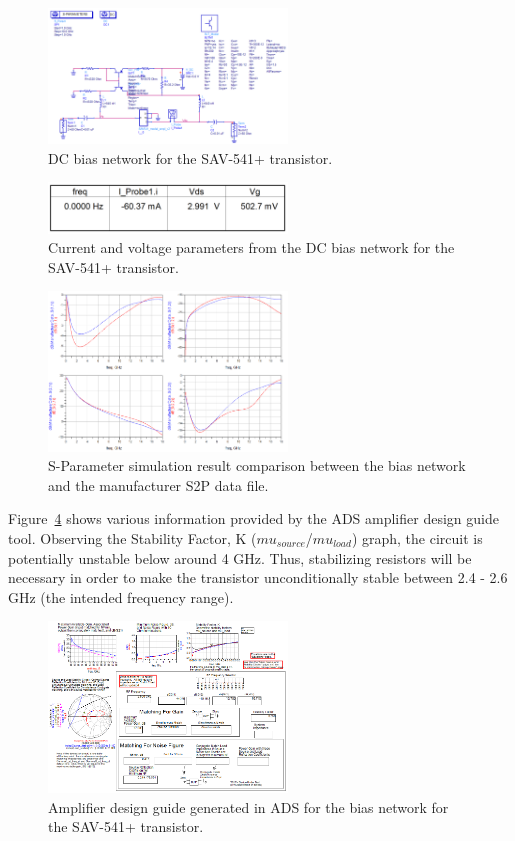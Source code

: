 \documentclass[conference]{IEEEtran}
\begin{document}
\begin{figure}[!h]
\centering
\includegraphics[width=2.5in]{pics/DCBiasNetwork.png}
\caption{DC bias network for the SAV-541+ transistor.}
\label{fig:dccircuit}
\end{figure}

\begin{figure}[!h]
\centering
\includegraphics[width=2.5in]{pics/DCBiasResults.png}
\caption{Current and voltage parameters from the DC bias network for the SAV-541+ transistor.}
\label{fig:dcvalues}
\end{figure}

\begin{figure}[!h]
\centering
\includegraphics[width=2.5in]{pics/SParameterComparison.png}
\caption{S-Parameter simulation result comparison between the bias network and the manufacturer S2P data file.}
\label{fig:sparamresult}
\end{figure}

Figure~\ref{fig:designguide} shows various information provided by the ADS amplifier design guide tool. Observing the Stability Factor, K ($mu_{source}$/$mu_{load}$) graph, the circuit is potentially unstable below around 4 GHz. Thus, stabilizing resistors will be necessary in order to make the transistor unconditionally stable between 2.4 - 2.6 GHz (the intended frequency range).

\begin{figure}[!h]
\centering
\includegraphics[width=2.5in]{pics/DesignGuideUnoptimized.png}
\caption{Amplifier design guide generated in ADS for the bias network for the SAV-541+ transistor.}
\label{fig:designguide}
\end{figure}
\end{document}
